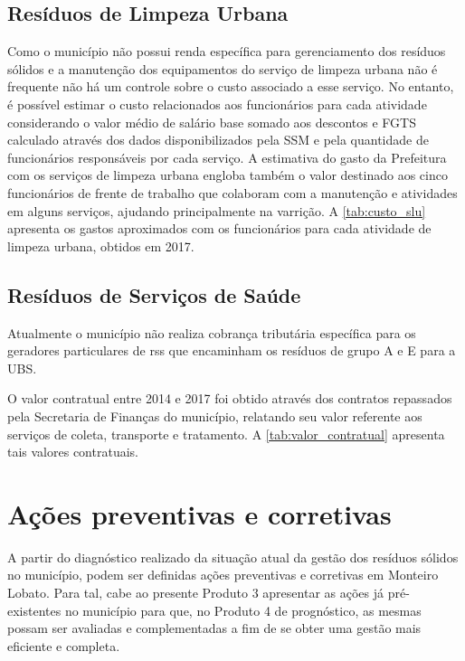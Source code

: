 	\subsection{Resíduos de Limpeza Urbana}
	Como o município não possui renda específica para gerenciamento dos resíduos sólidos e a manutenção dos equipamentos do serviço de limpeza urbana não é frequente não há um controle sobre o custo associado a esse serviço. No entanto, é possível estimar o custo relacionados aos funcionários para cada atividade considerando o valor médio de salário base somado aos descontos e FGTS calculado através dos dados disponibilizados pela SSM e pela quantidade de funcionários responsáveis por cada serviço. A estimativa do gasto da Prefeitura com os serviços de limpeza urbana engloba também o valor destinado aos cinco funcionários de frente de trabalho que colaboram com a manutenção e atividades em alguns serviços, ajudando principalmente na varrição.  A \autoref{tab:custo_slu} apresenta os gastos aproximados com os funcionários para cada atividade de limpeza urbana, obtidos em 2017.
	
	
	
	\subsection{Resíduos de Serviços de Saúde}
	Atualmente o município não realiza cobrança tributária específica para os geradores particulares de \gls{rss} que encaminham os resíduos de grupo A e E para a UBS.
	
	O valor contratual entre 2014 e 2017 foi obtido através dos contratos repassados pela Secretaria de Finanças do município, relatando seu valor referente aos serviços de coleta, transporte e tratamento. A \autoref{tab:valor_contratual} apresenta tais valores contratuais.
	
	
	
	\section{Ações preventivas e corretivas}
	A partir do diagnóstico realizado da situação atual da gestão dos resíduos sólidos no município, podem ser definidas ações preventivas e corretivas em Monteiro Lobato. Para tal, cabe ao presente Produto 3 apresentar as ações já pré-existentes no município para que, no Produto 4 de prognóstico, as mesmas possam ser avaliadas e complementadas a fim de se obter uma gestão mais eficiente e completa.
	
